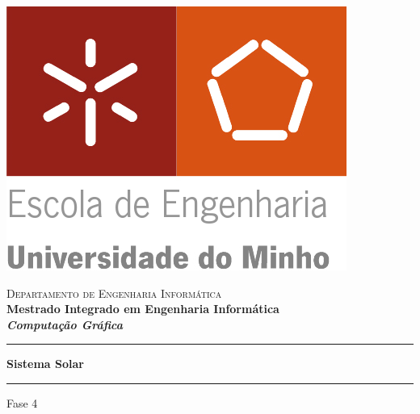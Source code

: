\begin{titlepage}


\begin{minipage}{0.3\textwidth}
\begin{flushleft} 
\includegraphics[width=\textwidth]{logo.png}
\end{flushleft}
\end{minipage}
\begin{minipage}{0.6\textwidth}
\begin{flushright} 

\textsc{Departamento de Engenharia Informática}\\[0.1cm]
\bfseries Mestrado Integrado em Engenharia Informática \\ [0.1cm]
\bfseries \textit{Computação Gráfica}\\[8mm]

\end{flushright}
\end{minipage}


\vspace{3cm}

\begin{center}
	
\rule{6cm}{0.6pt}\par
\vspace{0.5cm}
\textbf{\Huge Sistema Solar }\par\vspace{0.5\baselineskip}
\rule[0.5\baselineskip]{8cm}{0.6pt}
\vspace{1.5cm}


\LARGE Fase 4


\end{center}
\end{titlepage}
